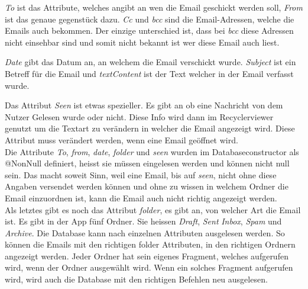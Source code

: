 \documentclass[a4paper,11pt]{article}
\begin{document}
\textit{To} ist das Attribute, welches angibt an wen die Email geschickt werden soll, \textit{From} ist das genaue gegenstück dazu. \textit{Cc} und \textit{bcc} sind die 
Email-Adressen, welche die Emails auch bekommen. Der einzige unterschied ist, dass bei \textit{bcc} diese Adressen nicht einsehbar sind und somit nicht bekannt ist wer diese Email auch liest. 

\textit{Date} gibt das Datum an, an welchem die Email verschickt wurde. \textit{Subject} ist ein Betreff für die Email und \textit{textContent} ist der Text welcher in der Email verfasst wurde. 

Das Attribut \textit{Seen} ist etwas spezieller. Es gibt an ob eine Nachricht von dem Nutzer Gelesen wurde oder nicht. Diese Info wird dann im Recyclerviewer genutzt um die Textart zu verändern
in welcher die Email angezeigt wird. Diese Attribut muss verändert werden, wenn eine Email geöffnet wird. \\

Die Attribute \textit{To}, \textit{from}, \textit{date}, \textit{folder} und \textit{seen} wurden im Databaseconstructor als @NonNull definiert, heisst sie müssen eingelesen werden und können 
nicht null sein. Das macht soweit Sinn, weil eine Email, bis auf \textit{seen}, nicht ohne diese Angaben versendet werden können und ohne zu wissen in welchem Ordner die Email einzuordnen ist,
kann die Email auch nicht richtig angezeigt werden. \\

Als letztes gibt es noch das Attribut \textit{folder}, es gibt an, von welcher Art die Email ist. Es gibt in der App fünf Ordner. Sie heissen \textit{Draft}, \textit{Sent} 
\textit{Inbox}, \textit{Spam} und \textit{Archive}. Die Database kann nach einzelnen Attributen ausgelesen werden. So können die Emails mit den richtigen
folder Attributen, in den richtigen Ordnern angezeigt werden. Jeder Ordner hat sein eigenes Fragment, welches aufgerufen wird, wenn der Ordner ausgewählt wird.
Wenn ein solches Fragment aufgerufen wird, wird auch die Database mit den richtigen Befehlen neu ausgelesen.  \\


\end{document}
